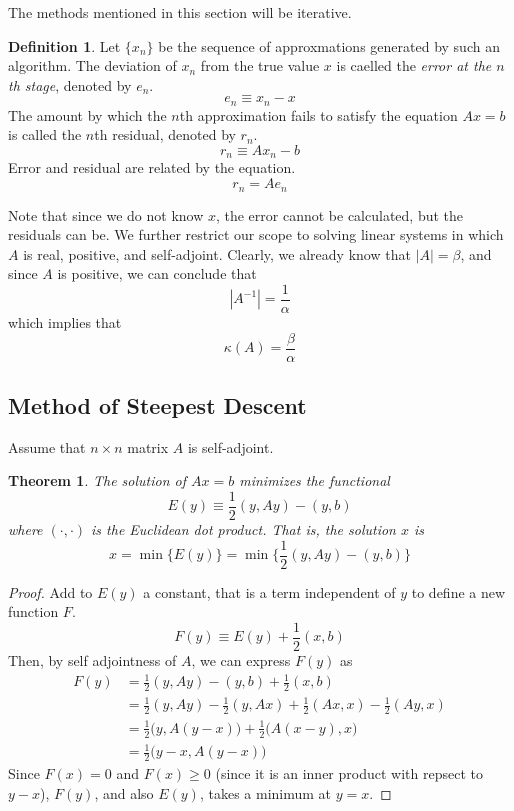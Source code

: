 \documentclass{article}
\newtheorem{theorem}{Theorem}[section]
\theoremstyle{remark}
\theoremstyle{definition}
\newtheorem{definition}{Definition}[section]
\begin{document}
The methods mentioned in this section will be iterative. 
\begin{definition}
Let $\{ x_n\}$ be the sequence of approxmations generated by such an algorithm. The deviation of $x_n$ from the true value $x$ is caelled the \textit{error at the $n$th stage}, denoted by $e_n$. 
\[e_n \equiv x_n - x\]
The amount by which the $n$th approximation fails to satisfy the equation $Ax = b$ is called the $n$th residual, denoted by $r_n$. 
\[r_n \equiv A x_n - b\]
Error and residual are related by the equation. 
\[r_n = A e_n\]
\end{definition}
Note that since we do not know $x$, the error cannot be calculated, but the residuals can be. We further restrict our scope to solving linear systems in which $A$ is real, positive, and self-adjoint. Clearly, we already know that $|A| = \beta$, and since $A$ is positive, we can conclude that 
\[|A^{-1}| = \frac{1}{\alpha}\]
which implies that
\[\kappa(A) = \frac{\beta}{\alpha}\]

\subsection{Method of Steepest Descent}
Assume that $n \times n$ matrix $A$ is self-adjoint.
\begin{theorem}
The solution of $Ax = b$ minimizes the functional 
\[E (y) \equiv \frac{1}{2} (y, A y) - (y, b)\]
where $(\cdot, \cdot)$ is the Euclidean dot product. That is, the solution $x$ is
\[x = \min \big\{ E(y) \big\} = \min \Big\{ \frac{1}{2} (y, Ay) - (y, b) \Big\}\]
\end{theorem}
\begin{proof}
Add to $E(y)$ a constant, that is a term independent of $y$ to define a new function $F$. 
\[F(y) \equiv E(y) + \frac{1}{2} (x, b)\]
Then, by self adjointness of $A$, we can express $F(y)$ as 
\begin{align*}
    F(y) & = \frac{1}{2} (y, Ay) - (y, b) + \frac{1}{2} (x, b) \\
    & = \frac{1}{2} (y, Ay) - \frac{1}{2} (y, Ax) + \frac{1}{2} (Ax, x) - \frac{1}{2} (Ay, x) \\
    & = \frac{1}{2} \big( y, A(y-x)\big) + \frac{1}{2} \big( A(x-y), x\big) \\
    & = \frac{1}{2} \big( y - x, A(y - x)\big) 
\end{align*}
Since $F(x) = 0$ and $F(x) \geq 0$ (since it is an inner product with repsect to $y-x$), $F(y)$, and also $E(y)$, takes a minimum at $y =x$. 
\end{proof}
\end{document}
